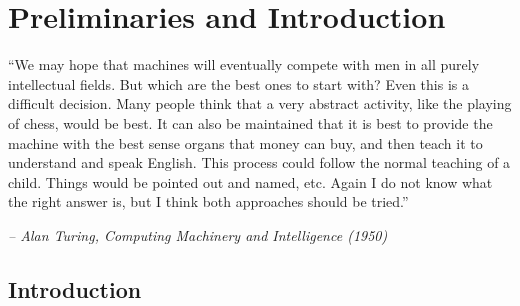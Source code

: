 \chapter{Preliminaries and Introduction}\label{ch:chapter1}
\epigraph{``We may hope that machines will eventually compete with men in all purely intellectual fields. But which are the best ones to start with? Even this is a difficult decision. Many people think that a very abstract activity, like the playing of chess, would be best. It can also be maintained that it is best to provide the machine with the best sense organs that money can buy, and then teach it to understand and speak English. This process could follow the normal teaching of a child. Things would be pointed out and named, etc. Again I do not know what the right answer is, but I think both approaches should be tried.''}{\textit{-- Alan Turing, Computing Machinery and Intelligence (1950)}}

\section{Introduction}
\lipsum[1]


\lipsum[1]